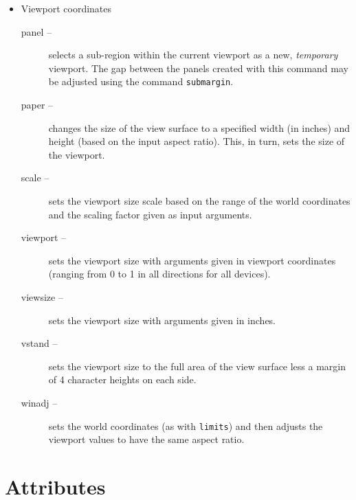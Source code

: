 \begin{itemize}
  \item Viewport coordinates
  \begin{description}
    \item [{panel --}]
      selects a sub-region within the current viewport
      as a new, {\it temporary} viewport.  The gap between the panels
      created with this command may be adjusted using the command
      {\tt submargin}.
    \item [{paper --}]
      changes the size of the view surface to a specified width
      (in inches) and height (based on the input aspect ratio).
      This, in turn, sets the size of the viewport.
    \item [{scale --}]
      sets the viewport size scale based on the range
      of the world coordinates and the scaling factor given as input arguments.
    \item [{viewport --}]
      sets the viewport size with arguments given in viewport
      coordinates (ranging from 0 to 1 in all directions for all devices).
    \item [{viewsize --}]
      sets the viewport size with arguments given in inches.
    \item [{vstand --}]
      sets the viewport size to the full area of the view surface less a
      margin of 4 character heights on each side.
    \item [{winadj --}]
      sets the world coordinates (as with {\tt limits})
      and then adjusts the viewport
      values to have the same aspect ratio.
  \end{description}
\end{itemize}

\section{Attributes}

